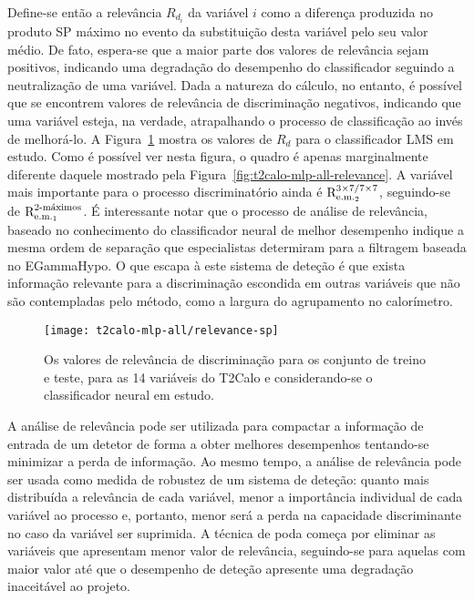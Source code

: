 Define-se então a relevância $R_{d_i}$ da variável $i$ como a diferença
produzida no produto SP máximo no evento da substituição desta variável pelo
seu valor médio. De fato, espera-se que a maior parte dos valores de
relevância sejam positivos, indicando uma degradação do desempenho do
classificador seguindo a neutralização de uma variável. Dada a natureza do
cálculo, no entanto, é possível que se encontrem valores de relevância de
discriminação negativos, indicando que uma variável esteja, na verdade,
atrapalhando o processo de classificação ao invés de melhorá-lo. A
Figura~\ref{fig:t2calo-mlp-all-relevance-disc} mostra os valores de $R_d$ para
o classificador LMS em estudo. Como é possível ver nesta figura, o quadro é
apenas marginalmente diferente daquele mostrado pela
Figura~\ref{fig:t2calo-mlp-all-relevance}. A variável mais importante para o
processo discriminatório ainda é $\rcore$, seguindo-se de $\eratio$. É
interessante notar que o processo de análise de relevância, baseado no
conhecimento do classificador neural de melhor desempenho indique a mesma
ordem de separação que especialistas determiram para a filtragem baseada no
EGammaHypo. O que escapa à este sistema de deteção é que exista informação
relevante para a discriminação escondida em outras variáveis que não são
contempladas pelo método, como a largura do agrupamento no calorímetro.

\begin{figure}
\begin{center}
\texttt{[image: t2calo-mlp-all/relevance-sp]}
\end{center}
\caption{Os valores de relevância de discriminação para os conjunto de treino e
teste, para as 14 variáveis do T2Calo e considerando-se o classificador neural
em estudo.}
\label{fig:t2calo-mlp-all-relevance-disc}
\end{figure}

A análise de relevância pode ser utilizada para compactar a informação de
entrada de um detetor de forma a obter melhores desempenhos tentando-se
minimizar a perda de informação. Ao mesmo tempo, a análise de relevância pode
ser usada como medida de robustez de um sistema de deteção: quanto mais
distribuída a relevância de cada variável, menor a importância individual de
cada variável ao processo e, portanto, menor será a perda na capacidade
discriminante no caso da variável ser suprimida. A técnica de poda começa por
eliminar as variáveis que apresentam menor valor de relevância, seguindo-se
para aquelas com maior valor até que o desempenho de deteção apresente uma
degradação inaceitável ao projeto.

